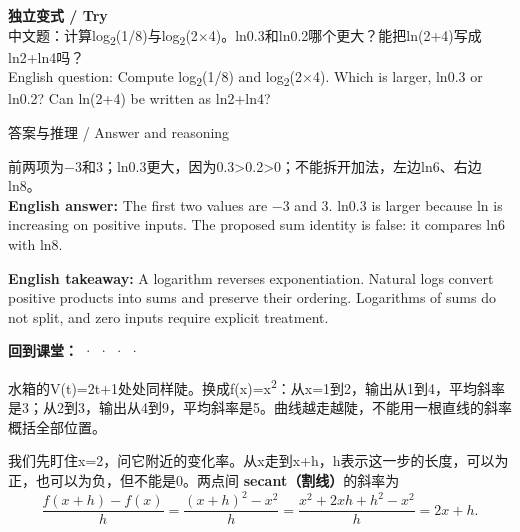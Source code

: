 \textbf{独立变式 / Try}\\

中文题：计算log\textsubscript{2}(1/8)与log\textsubscript{2}(2\ensuremath{\times}4)。ln0.3和ln0.2哪个更大？能把ln(2+4)写成ln2+ln4吗？\\

English question: Compute log\textsubscript{2}(1/8) and log\textsubscript{2}(2\ensuremath{\times}4). Which is larger, ln0.3 or ln0.2? Can ln(2+4) be written as ln2+ln4?



\begin{StudySolution}{答案与推理 / Answer and reasoning}


前两项为\ensuremath{-}3和3；ln0.3更大，因为0.3>0.2>0；不能拆开加法，左边ln6、右边ln8。\\

\textbf{English answer:} The first two values are \ensuremath{-}3 and 3. ln0.3 is larger because ln is increasing on positive inputs. The proposed sum identity is false: it compares ln6 with ln8.


\end{StudySolution}


\textbf{English takeaway:} A logarithm reverses exponentiation. Natural logs convert positive products into sums and preserve their ordering. Logarithms of sums do not split, and zero inputs require explicit treatment.


\textbf{回到课堂：}  ·  ·  ·  · 











水箱的V(t)=2t+1处处同样陡。换成f(x)=x\textsuperscript{2}：从x=1到2，输出从1到4，平均斜率是3；从2到3，输出从4到9，平均斜率是5。曲线越走越陡，不能用一根直线的斜率概括全部位置。


我们先盯住x=2，问它附近的变化率。从x走到x+h，h表示这一步的长度，可以为正，也可以为负，但不能是0。两点间 \textbf{secant（割线）}的斜率为
\[
\frac{f(x+h)-f(x)}{h}
=\frac{(x+h)^2-x^2}{h}
=\frac{x^2+2xh+h^2-x^2}{h}=2x+h.\tag{M.15}
\]


